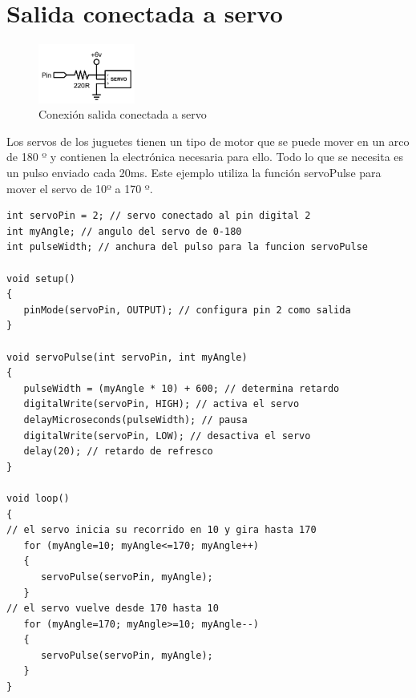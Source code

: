 \section{Salida conectada a servo}
\begin{figure}[!htp]
	\centering
	\includegraphics[width=90pt]{./Imagenes/Documentos/ArduinoNotebook_img07.png}
	\caption[Conexión salida conectada a servo]{Conexión salida conectada a servo}
\end{figure}

Los servos de los juguetes tienen un tipo de motor que se puede mover en un arco de 180 º y contienen la electrónica necesaria para ello. Todo lo que se necesita es un pulso enviado cada 20ms. Este ejemplo utiliza la función servoPulse para mover el servo de 10º a 170 º.
\begin{lstlisting}
int servoPin = 2; // servo conectado al pin digital 2
int myAngle; // angulo del servo de 0-180
int pulseWidth; // anchura del pulso para la funcion servoPulse

void setup()
{
   pinMode(servoPin, OUTPUT); // configura pin 2 como salida
}

void servoPulse(int servoPin, int myAngle)
{
   pulseWidth = (myAngle * 10) + 600; // determina retardo 
   digitalWrite(servoPin, HIGH); // activa el servo
   delayMicroseconds(pulseWidth); // pausa
   digitalWrite(servoPin, LOW); // desactiva el servo
   delay(20); // retardo de refresco
}

void loop()
{
// el servo inicia su recorrido en 10 y gira hasta 170
   for (myAngle=10; myAngle<=170; myAngle++)
   {
      servoPulse(servoPin, myAngle);
   }
// el servo vuelve desde 170 hasta 10
   for (myAngle=170; myAngle>=10; myAngle--)
   {
      servoPulse(servoPin, myAngle);
   }
}
\end{lstlisting}